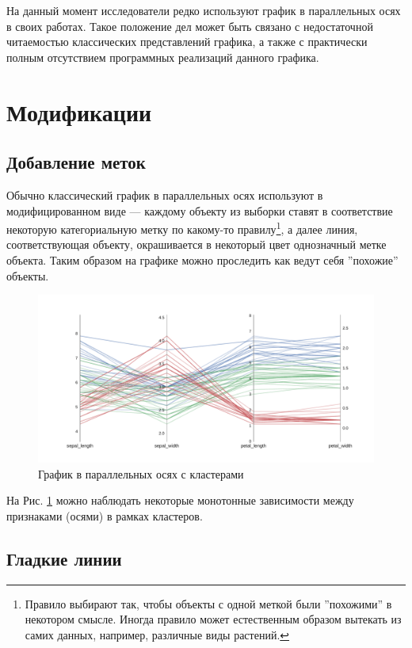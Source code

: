 \documentclass[12pt,fleqn]{article}
\begin{document}
На данный момент исследователи редко используют график в параллельных осях в своих работах. Такое положение дел может 
быть связано с недостаточной читаемостью классических представлений графика, а также с практически полным отсутствием программных реализаций данного 
графика. 

\section{Модификации}

\subsection{Добавление меток}

Обычно классический график в параллельных осях используют в модифицированном виде ---
каждому объекту из выборки ставят в соответствие некоторую категориальную метку по какому-то правилу\footnote{
Правило выбирают так, чтобы объекты с одной меткой были ''похожими'' в некотором смысле. Иногда правило может естественным образом вытекать из самих данных,
например, различные виды растений. },
а далее линия, соответствующая объекту, окрашивается в некоторый цвет однозначный метке объекта.
Таким образом на графике можно проследить как ведут себя ''похожие'' объекты. 

\begin{figure}[htb]
    \centering
    \includegraphics[width=15cm]{color_pc.pdf}
    \caption{График в параллельных осях с кластерами}
    \label{color_pc}
\end{figure}

На Рис. \ref{color_pc} можно наблюдать некоторые монотонные зависимости между признаками (осями) в рамках кластеров.


\subsection{Гладкие линии}
\end{document}
